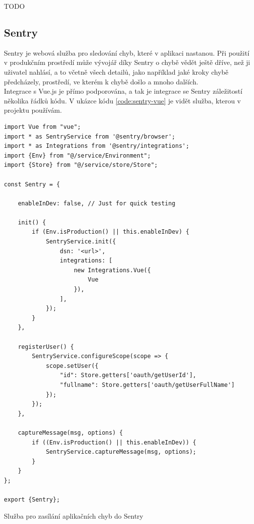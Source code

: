 TODO


\subsection{Sentry}

Sentry \cite{sentry} je webová služba pro sledování chyb, které v aplikaci nastanou. Při použití v produkčním prostředí může vývojář díky Sentry o chybě vědět ještě dříve, než ji uživatel nahlásí, a to včetně všech detailů, jako například jaké kroky chybě předcházely, prostředí, ve kterém k chybě došlo a mnoho dalších.\\
Integrace s Vue.js je přímo podporována, a tak je integrace se Sentry záležitostí několika řádků kódu. V ukázce kódu \ref{code:sentry-vue} je vidět služba, kterou v projektu používám.

\begin{listing}[H]
\begin{verbatim}
import Vue from "vue";
import * as SentryService from '@sentry/browser';
import * as Integrations from '@sentry/integrations';
import {Env} from "@/service/Environment";
import {Store} from "@/service/store/Store";

const Sentry = {

    enableInDev: false, // Just for quick testing

    init() {
        if (Env.isProduction() || this.enableInDev) {
            SentryService.init({
                dsn: '<url>',
                integrations: [
                    new Integrations.Vue({
                        Vue
                    }),
                ],
            });
        }
    },

    registerUser() {
        SentryService.configureScope(scope => {
            scope.setUser({
                "id": Store.getters['oauth/getUserId'],
                "fullname": Store.getters['oauth/getUserFullName']
            });
        });
    },

    captureMessage(msg, options) {
        if ((Env.isProduction() || this.enableInDev)) {
            SentryService.captureMessage(msg, options);
        }
    }
};

export {Sentry};
\end{verbatim}
\caption{Služba pro zasílání aplikačních chyb do Sentry} \label{code:sentry-vue}
\end{listing}

